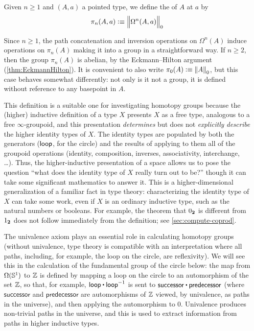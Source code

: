 \begin{defn}\label{def-of-homotopy-groups}
  Given $n\ge 1$ and $(A,a)$ a pointed type, we define the  of $A$
  at $a$ by
  \[\pi_n(A,a)\defeq \Trunc0{\Omega^n(A,a)}\]
\end{defn}

\noindent
Since $n\ge 1$, the path concatenation and inversion operations on
$\Omega^n(A)$ induce operations on $\pi_n(A)$ making it into a group in
a straightforward way.  If $n\ge 2$, then the group $\pi_n(A)$ is
abelian, by the Eckmann--Hilton argument  (\autoref{thm:EckmannHilton}).
It is convenient to also write $\pi_0(A) \defeq \trunc0 A$,
but this case behaves somewhat differently: not only is it not a group,
it is defined without reference to any basepoint in $A$.

%
This definition is a suitable one for investigating homotopy groups
because the (higher) inductive definition of a type $X$ presents $X$ as
a free type, analogous to a free $\infty$-groupoid,
%
and this
presentation \emph{determines} but does not \emph{explicitly describe}
the higher identity types of $X$.  The identity types are populated by
both the generators ($\lloop$, for the circle) and the results of applying to them all of the groupoid
operations (identity, composition, inverses, associativity, interchange,
\ldots).  Thus, the higher-inductive presentation of a space allows us
to pose the question ``what does the identity type of $X$ really turn out
to be?'' though it can take some significant mathematics to answer it.
This is a higher-dimensional generalization of a familiar fact in type
theory: characterizing the identity type of $X$ can take some work,
even if $X$ is an ordinary inductive type, such as the natural numbers
or booleans.  For example, the theorem that $\bfalse$ is different
from $\btrue$ does not follow immediately from the definition;
see \autoref{sec:compute-coprod}.

%
The univalence axiom plays an essential role in calculating homotopy
groups (without univalence, type theory is compatible with an
interpretation where all paths, including, for example, the loop on the
circle, are reflexivity).  We will see this in the calculation of the
fundamental group of the circle below: the map from $\Omega(\Sn^1)$ to $\Z$ is defined by mapping a loop on the circle to an
automorphism of the set $\Z$, so that, for example, $\lloop \ct \opp
\lloop$ is sent to $\mathsf{successor} \ct \mathsf{predecessor}$ (where
$\mathsf{successor}$ and $\mathsf{predecessor}$ are automorphisms of
$\Z$ viewed, by univalence, as paths in the universe), and then applying
the automorphism to 0. Univalence produces non-trivial paths in the
universe, and this is used to extract information from paths in higher
inductive types.

